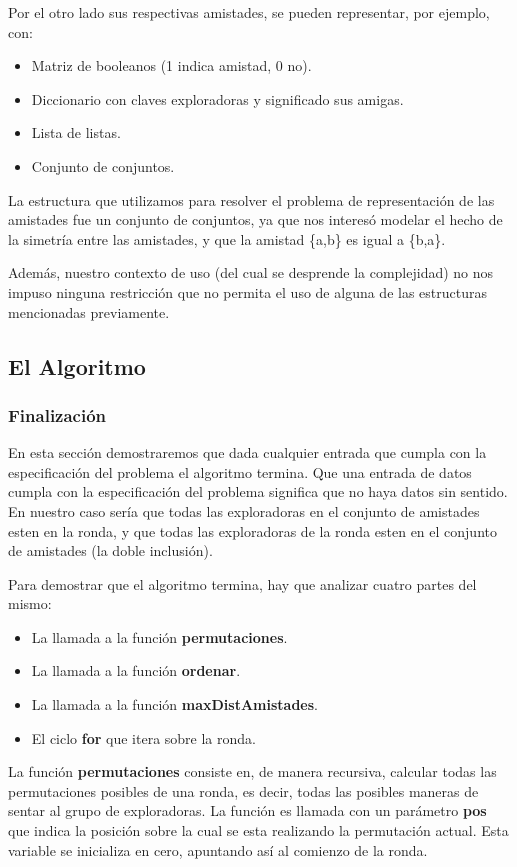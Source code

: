 \documentclass[11pt]{article}
\begin{document}
Por el otro lado sus respectivas amistades, se pueden representar, por ejemplo, con:
\begin{itemize}
\item Matriz de booleanos (1 indica amistad, 0 no).
\item Diccionario con claves exploradoras y significado sus amigas.
\item Lista de listas.
\item Conjunto de conjuntos.
\end{itemize}
La estructura que utilizamos para resolver el problema de representación de las amistades fue un conjunto de
conjuntos, ya que nos interesó modelar el hecho de la simetría entre las amistades, y que la amistad 
\{a,b\} es igual a \{b,a\}.

Además, nuestro contexto de uso (del cual se desprende la complejidad) no 
nos impuso ninguna restricción que no permita el uso de alguna de las estructuras mencionadas previamente.

\subsection{El Algoritmo}

\subsubsection{Finalización}

En esta sección demostraremos que dada cualquier entrada que cumpla con la especificación del problema el 
algoritmo termina. Que una entrada de datos cumpla con la especificación del problema significa que no haya
datos sin sentido. En nuestro caso sería que todas las exploradoras en el conjunto de amistades esten en la  
ronda, y que todas las exploradoras de la ronda esten en el conjunto de amistades (la doble inclusión).

Para demostrar que el algoritmo termina, hay que analizar cuatro partes del mismo:
\begin{itemize}
  \item La llamada a la función \textbf{permutaciones}.
  \item La llamada a la función \textbf{ordenar}.
  \item La llamada a la función \textbf{maxDistAmistades}.
  \item El ciclo \textbf{for} que itera sobre la ronda.
\end{itemize}

La función \textbf{permutaciones} consiste en, de manera recursiva, calcular todas las permutaciones posibles 
de una ronda, es decir, todas las posibles maneras de sentar al grupo de exploradoras.
La función es llamada con un parámetro \textbf{pos} que indica la posición sobre la cual se esta realizando 
la permutación actual. Esta variable se inicializa en cero, apuntando así al comienzo de la ronda.
\end{document}
